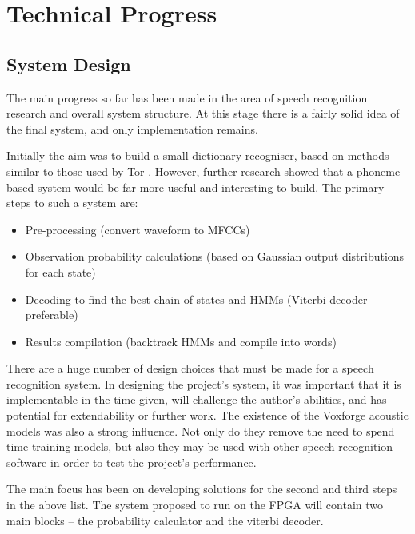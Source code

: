 \chapter{Technical Progress} %
\label{cha:technical_progress}


\section{System Design} %
\label{sec:system_design}
The main progress so far has been made in the area of speech recognition research and overall system structure.  At this stage there is a fairly solid idea of the final system, and only implementation remains.

Initially the aim was to build a small dictionary recogniser, based on methods similar to those used by Tor \cite{tor2003}.  However, further research showed that a phoneme based system would be far more useful and interesting to build.  The primary steps to such a system are:
\begin{itemize}
	\item Pre-processing (convert waveform to MFCCs)
	\item Observation probability calculations (based on Gaussian output distributions for each state)
	\item Decoding to find the best chain of states and HMMs (Viterbi decoder preferable)
	\item Results compilation (backtrack HMMs and compile into words)
\end{itemize}

There are a huge number of design choices that must be made for a speech recognition system.  In designing the project's system, it was important that it is implementable in the time given, will challenge the author's abilities, and has potential for extendability or further work.  The existence of the Voxforge acoustic models was also a strong influence.  Not only do they remove the need to spend time training models, but also they may be used with other speech recognition software in order to test the project's performance.

The main focus has been on developing solutions for the second and third steps in the above list.  The system proposed to run on the FPGA will contain two main blocks -- the probability calculator and the viterbi decoder.


